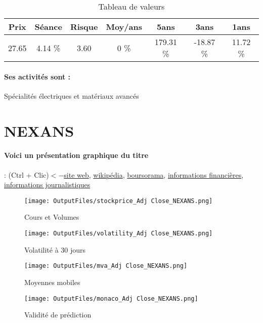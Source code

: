 \documentclass[11pt,a4paper]{report}%
\begin{document}
\begin{table}[H]
  \centering
    \begin{tabular}{|c|c|c|c|c|c|c|}
    \hline
    Prix & Séance & Risque  & Moy/ans & 5ans & 3ans & 1ans \\
    \hline
    27.65 &    4.14 \%    & 3.60 & 0 \% & 179.31 \% & -18.87 \% & 11.72 \% \\
    \hline
    \end{tabular}%
        \label{tab:table_MERSEN}%
      \caption{Tableau de valeurs}
\end{table}%

\paragraph{Ses activités sont : } Spécialités électriques et matériaux avancés  
    
    \newpage

\section{NEXANS}

\paragraph{Voici un présentation graphique du titre} : (Ctrl + Clic)$<-$\href{https://www.nexans.com/fr/finance/Investor-relations.html}{site web}, \href{https://fr.wikipedia.org/wiki/Nexans}{wikipédia}, \href{https://www.boursorama.com/cours/1rPNEX}{boursorama}, \href{https://www.qwant.com/?q=site:https:%2f%2fwww.easybourse.com%2faction-societe%2fNEXANS&t=web&client=ext-firefox-hp}{informations financières}, \href{https://bourse.lerevenu.com/cours-de-bourse/fiche-valeur-synthese/NEXANS/NEX-FR}{informations journalistiques}
\begin{figure}[!htb]
   \begin{minipage}{0.5\textwidth}
     \centering
     \texttt{[image: OutputFiles/stockprice\_Adj Close\_NEXANS.png]}
     \caption{Cours et Volumes}\label{Fig:price_NEXANS}
   \end{minipage}\hfill
   \begin{minipage}{0.5\textwidth}
     \centering
     \texttt{[image: OutputFiles/volatility\_Adj Close\_NEXANS.png]}
     \caption{Volatilité à 30 jours}\label{Fig:volat_NEXANS}
   \end{minipage}
\end{figure}
\begin{figure}[!htb]
   \begin{minipage}{0.5\textwidth}
     \centering
     \texttt{[image: OutputFiles/mva\_Adj Close\_NEXANS.png]}
     \caption{Moyennes mobiles}\label{Fig:mva_NEXANS}
   \end{minipage}\hfill
   \begin{minipage}{0.5\textwidth}
     \centering
     \texttt{[image: OutputFiles/monaco\_Adj Close\_NEXANS.png]}
     \caption{Validité de prédiction}\label{Fig:prediction_NEXANS}
   \end{minipage}
\end{figure}
\end{document}
